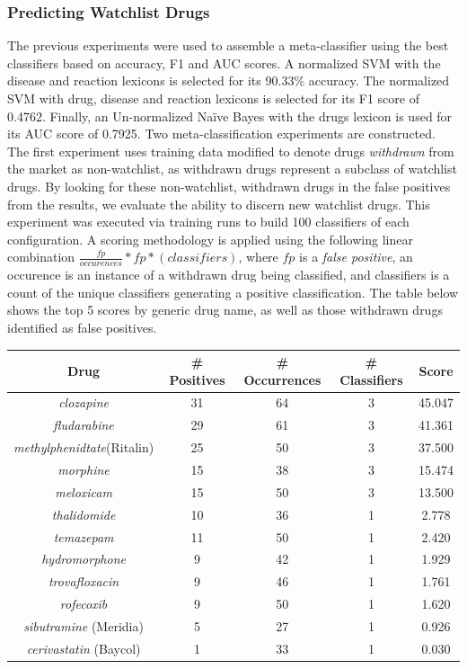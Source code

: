 \documentclass[twoside,11pt]{article}
\begin{document}
\subsubsection{Predicting Watchlist Drugs}
The previous experiments were used to assemble a meta-classifier using the best classifiers based on accuracy, F1 and AUC scores. A normalized SVM with the disease and reaction lexicons is selected for its 90.33\% accuracy. The normalized SVM with drug, disease and reaction lexicons is selected for its F1 score of 0.4762. Finally, an Un-normalized Na\"ive Bayes with the drugs lexicon is used for its AUC score of 0.7925.
Two meta-classification experiments are constructed. The first experiment uses training data modified to denote drugs \textit{withdrawn} from the market as non-watchlist, as withdrawn drugs represent a subclass of watchlist drugs. By looking for these non-watchlist, withdrawn drugs in the false positives from the results, we evaluate the ability to discern new watchlist drugs. This experiment was executed via training runs to build 100 classifiers of each configuration. A scoring methodology is applied using the following linear combination $\frac{fp}{occurences} * fp * (classifiers)$, where $fp$ is a \textit{false positive}, an occurence is an instance of a withdrawn drug being classified, and classifiers is a count of the unique classifiers generating a positive classification. The table below shows the top 5 scores by generic drug name, as well as those withdrawn drugs identified as false positives.
\begin{center}
  \begin{tabular}{||c c c c c||}
    \hline
    Drug & # Positives & # Occurrences & # Classifiers & Score \\
    \hline\hline
    \textit{clozapine} & 31 & 64 & 3 & 45.047 \\
    \hline
    \textit{fludarabine} & 29 & 61 & 3 & 41.361 \\
    \hline
    \textit{methylphenidtate}(Ritalin) & 25 & 50 & 3 & 37.500 \\
    \hline
    \textit{morphine} & 15 & 38 & 3 & 15.474 \\
    \hline
    \textit{meloxicam} & 15 & 50 & 3 & 13.500 \\
    \hline\hline
    \textit{thalidomide} & 10 & 36 & 1 & 2.778 \\
    \textit{temazepam} & 11 & 50 & 1 & 2.420 \\
    \textit{hydromorphone} & 9 & 42 & 1 & 1.929 \\
    \textit{trovafloxacin} & 9 & 46 & 1 & 1.761 \\
    \textit{rofecoxib} & 9 & 50 & 1 & 1.620 \\
    \textit{sibutramine} (Meridia) & 5 & 27 & 1 & 0.926 \\
    \textit{cerivastatin} (Baycol) & 1 & 33 & 1 & 0.030 \\
    \hline
  \end{tabular}
\end{center}
\end{document}
